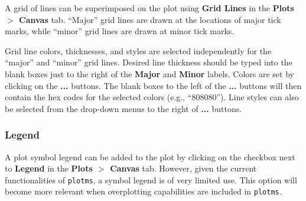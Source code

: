 A grid of lines can be superimposed on the plot using {\bf Grid Lines} in the {\bf Plots $>$ Canvas} tab. ``Major'' grid lines are drawn at the locations of major tick marks, while ``minor'' grid lines are drawn at minor tick marks.

Grid line colors, thicknesses, and styles are selected independently for the ``major'' and ``minor'' grid lines. Desired line thickness should be typed into the blank boxes just to the right of the {\bf Major} and {\bf Minor} labels. Colors are set  by clicking on the {\bf ...} buttons. The blank boxes to the left of the {\bf ...} buttons will then contain the hex codes for the selected colors (e.g., ``808080''). Line styles can also be selected from the drop-down menus to the right of {\bf ...} buttons.  


\subsubsection{Legend}
\label{section:edit.plot.plotms.legend}

A plot symbol legend can be added to the plot by clicking on the checkbox next to {\bf Legend} in the {\bf Plots $>$ Canvas} tab. However, given the current functionalities of {\tt plotms}, a symbol legend is of very limited use. This option will become more relevant when overplotting capabilities are included in {\tt plotms}.

